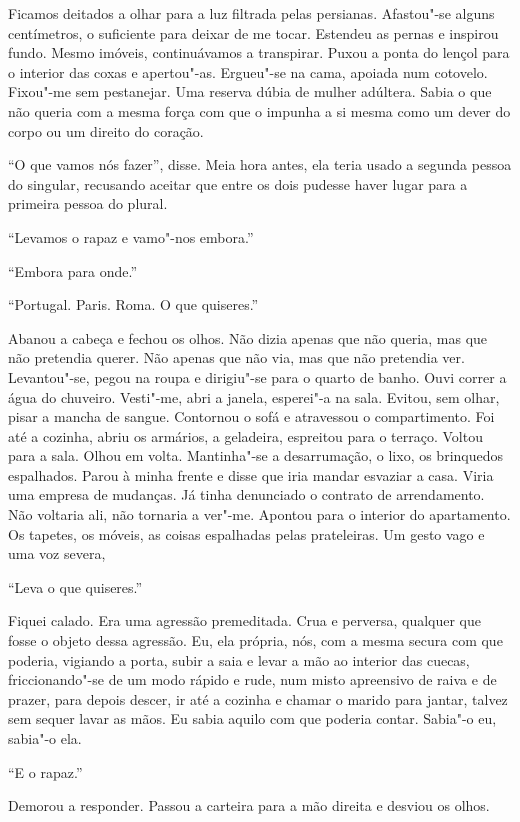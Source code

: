 Ficamos deitados a olhar para a luz filtrada pelas persianas. Afastou"-se
alguns centímetros, o suficiente para deixar de me tocar. Estendeu as
pernas e inspirou fundo. Mesmo imóveis, continuávamos a transpirar.
Puxou a ponta do lençol para o interior das coxas e apertou"-as.
Ergueu"-se na cama, apoiada num cotovelo. Fixou"-me sem pestanejar. Uma
reserva dúbia de mulher adúltera. Sabia o que não queria com a mesma
força com que o impunha a si mesma como um dever do corpo ou um direito
do coração.

``O que vamos nós fazer'',
disse. Meia hora antes, ela teria usado a segunda pessoa do singular,
recusando aceitar que entre os dois pudesse haver lugar para a primeira
pessoa do plural.

``Levamos o rapaz e vamo"-nos embora.''

``Embora para onde.''

``Portugal. Paris. Roma. O que quiseres.''

Abanou a cabeça e fechou os olhos. Não dizia apenas que não queria, mas
que não pretendia querer. Não apenas que não via, mas que não pretendia
ver. Levantou"-se, pegou na roupa e dirigiu"-se para o quarto de banho.
Ouvi correr a água do chuveiro. Vesti"-me, abri a janela, esperei"-a na
sala. Evitou, sem olhar, pisar a mancha de sangue. Contornou o sofá e
atravessou o compartimento. Foi até a cozinha, abriu os armários, a
geladeira, espreitou para o terraço. Voltou para a sala. Olhou em
volta. Mantinha"-se a desarrumação, o lixo, os brinquedos espalhados.
Parou à minha frente e disse que iria mandar esvaziar a casa. Viria uma
empresa de mudanças. Já tinha denunciado o contrato de arrendamento. Não
voltaria ali, não tornaria a ver"-me. Apontou para o interior do
apartamento. Os tapetes, os móveis, as coisas espalhadas pelas
prateleiras. Um gesto vago e uma voz severa,

``Leva o que quiseres.''

Fiquei calado. Era uma agressão premeditada. Crua e perversa, qualquer
que fosse o objeto dessa agressão. Eu, ela própria, nós, com a mesma
secura com que poderia, vigiando a porta, subir a saia e levar a mão ao
interior das cuecas, friccionando"-se de um modo rápido e rude, num
misto apreensivo de raiva e de prazer, para depois descer, ir até a
cozinha e chamar o marido para jantar, talvez sem sequer lavar as mãos.
Eu sabia aquilo com que poderia contar. Sabia"-o eu, sabia"-o ela.

``E o rapaz.''

Demorou a responder. Passou a carteira para a mão direita e desviou os
olhos.

